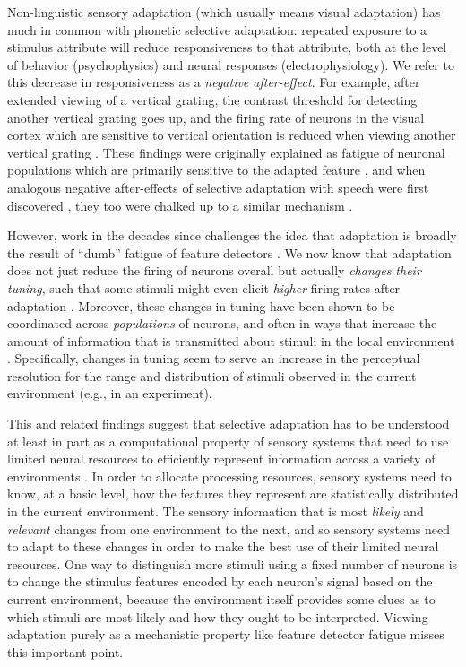 Non-linguistic sensory adaptation (which usually means visual adaptation) has much in common with phonetic selective adaptation: repeated exposure to a stimulus attribute will reduce responsiveness to that attribute, both at the level of behavior (psychophysics) and neural responses (electrophysiology).  We refer to this decrease in responsiveness as a \emph{negative after-effect}.  For example, after extended viewing of a vertical grating, the contrast threshold for detecting another vertical grating goes up, and the firing rate of neurons in the visual cortex which are sensitive to vertical orientation is reduced when viewing another vertical grating \autocite[cf.][]{Kohn2007}.  These findings were originally explained as fatigue of neuronal populations which are primarily sensitive to the adapted feature \autocite{Blakemore1969}, and when analogous negative after-effects of selective adaptation with speech were first discovered \autocite{Eimas1973}, they too were chalked up to a similar mechanism \autocite[although not without debate, some of which we revisit below; e.g.,][]{Cole1975,Ainsworth1977}.

However, work in the decades since challenges the idea that adaptation is broadly the result of ``dumb'' fatigue of feature detectors \autocite{Kohn2007,Webster2005}.  We now know that adaptation does not just reduce the firing of neurons overall but actually \emph{changes their tuning}, such that some stimuli might even elicit \emph{higher} firing rates after adaptation \autocite{Dragoi2000,Gutfreund2012,Kohn2004}.  Moreover, these changes in tuning have been shown to be coordinated across \emph{populations} of neurons, and often in ways that increase the amount of information that is transmitted about stimuli in the local environment \autocite{Brenner2000,Fairhall2001,Gutnisky2008,Sharpee2006}.  Specifically, changes in tuning seem to serve an increase in the perceptual resolution for the range and distribution of stimuli observed in the current environment (e.g., in an experiment).

This and related findings suggest that selective adaptation has to be understood at least in part as a computational property of sensory systems that need to use limited neural resources to efficiently represent information across a variety of environments \autocite{Brenner2000,Fairhall2001,Gutnisky2008,Kohn2007,Sharpee2006,Wainwright1999,Webster2005}. In order to allocate processing resources, sensory systems need to know, at a basic level, how the features they represent are statistically distributed in the current environment. The sensory information that is most \emph{likely} and \emph{relevant} changes from one environment to the next, and so sensory systems need to adapt to these changes in order to make the best use of their limited neural resources.  One way to distinguish more stimuli using a fixed number of neurons is to change the stimulus features encoded by each neuron's signal based on the current environment, because the environment itself provides some clues as to which stimuli are most likely and how they ought to be interpreted. Viewing adaptation purely as a mechanistic property like feature detector fatigue misses this important point.

